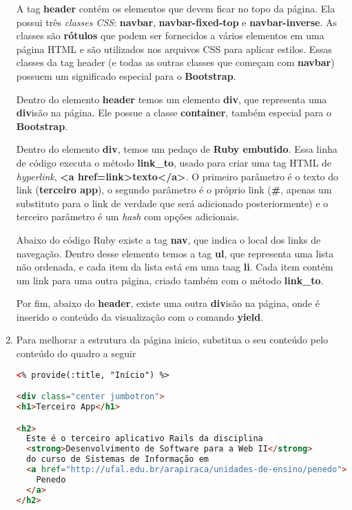 \documentclass[a4paper,12pt]{article}
\begin{document}
\begin{enumerate}
  A tag \textbf{header} contém os elementos que devem ficar no topo da página. Ela possui três \textit{classes CSS}: \textbf{navbar}, \textbf{navbar-fixed-top} e \textbf{navbar-inverse}. As classes são \textbf{rótulos} que podem ser fornecidos a vários elementos em uma página HTML e são utilizados nos arquivos CSS para aplicar estilos. Essas classes da tag header (e todas as outras classes que começam com \textbf{navbar}) possuem um significado especial para o \textbf{Bootstrap}.

  Dentro do elemento \textbf{header} temos um elemento \textbf{div}, que representa uma \textbf{div}isão na página. Ele possue a classe \textbf{container}, também especial para o \textbf{Bootstrap}.

  Dentro do elemento \textbf{div}, temos um pedaço de \textbf{Ruby embutido}. Essa linha de código executa o método \textbf{link\_to}, usado para criar uma tag HTML de \textit{hyperlink}, \textbf{<a href=\textquotesingle link\textquotesingle>texto</a>}. O primeiro parâmetro é o texto do link (\textbf{\textquotesingle terceiro app\textquotesingle}), o segundo parâmetro é o próprio link (\textbf{\textquotesingle \#\textquotesingle}, apenas um substituto para o link de verdade que será adicionado posteriormente) e o terceiro parâmetro é um \textit{hash} com opções adicionais.

  Abaixo do código Ruby existe a tag \textbf{nav}, que indica o local dos links de navegação. Dentro desse elemento temos a tag \textbf{ul}, que representa uma lista não ordenada, e cada item da lista está em uma taag \textbf{li}. Cada item contém um link para uma outra página, criado também com o método \textbf{link\_to}.

  Por fim, abaixo do \textbf{header}, existe uma outra \textbf{div}isão na página, onde é inserido o conteúdo da visualização com o comando \textbf{yield}.

  \item Para melhorar a estrutura da página inicio, substitua o seu conteúdo pelo conteúdo do quadro a seguir
  \begin{lstlisting}[language=html, title={app/views/paginas\_estaticas/inicio.html.erb}]
<% provide(:title, "Início") %>

<div class="center jumbotron">
<h1>Terceiro App</h1>

<h2>
  Este é o terceiro aplicativo Rails da disciplina
  <strong>Desenvolvimento de Software para a Web II</strong>
  do curso de Sistemas de Informação em
  <a href="http://ufal.edu.br/arapiraca/unidades-de-ensino/penedo">
    Penedo
  </a>
</h2>


\end{lstlisting}
\end{enumerate}
\end{document}
